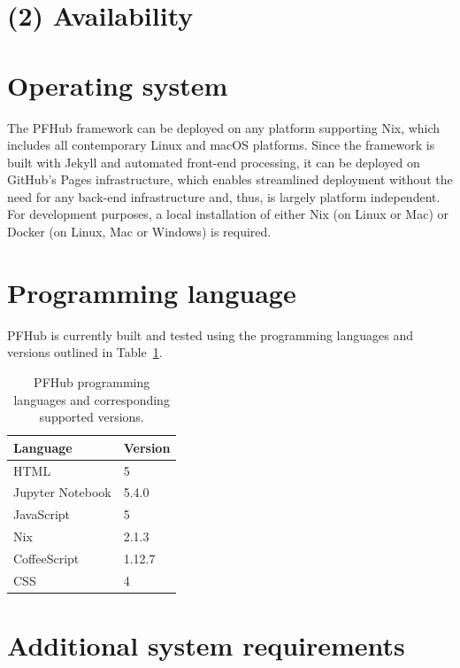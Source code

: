 \documentclass{jors}
\begin{document}
\section*{(2) Availability}
\vspace{0.5cm}
\section*{Operating system}

The PFHub framework can be deployed on any platform supporting Nix,
which includes all contemporary Linux and macOS platforms. Since the
framework is built with Jekyll and automated front-end processing, it
can be deployed on GitHub's Pages infrastructure, which enables
streamlined deployment without the need for any back-end
infrastructure and, thus, is largely platform independent. For
development purposes, a local installation of either Nix (on Linux or
Mac) or Docker (on Linux, Mac or Windows) is required.

\section*{Programming language}

PFHub is currently built and tested using the programming languages
and versions outlined in Table~\ref{tab:versions}.

\begin{table}[h!]
  \centering
  \caption{PFHub programming languages and corresponding supported
    versions.}
  \begin{tabular}{|l|l|}
    \hline
    Language         & Version \\
    \hline
    HTML             & 5       \\
    Jupyter Notebook & 5.4.0   \\
    JavaScript       & 5       \\
    Nix              & 2.1.3   \\
    CoffeeScript     & 1.12.7  \\
    CSS              & 4       \\
    \hline
  \end{tabular}
  \label{tab:versions}
\end{table}


\section*{Additional system requirements}
\end{document}
